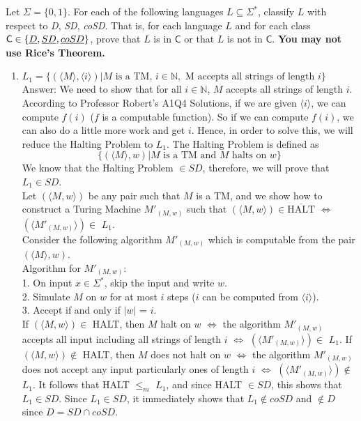 \documentclass{csc_assignment}
\begin{document}
\begin{description}
  Let $\Sigma = \{0,1\}$.
  For each of the following languages $L \subseteq \Sigma^*$, classify $L$ with respect to \emph{D}, \emph{SD}, \emph{coSD}.
  That is, for each language $L$ and for each class $\mathsf{C} \in \{\emph{D}, \emph{SD}, \emph{coSD}\}$, prove that $L$ is in $\mathsf{C}$ or that $L$ is not in $\mathsf{C}$.
  {\bf You may not use Rice's Theorem.}
  \begin{enumerate}
  \item $L_1 = \{(\langle{M}\rangle, \langle{i}\rangle) | M \text{ is a TM, } i \in \mathbb{N}, \text{ M accepts all strings of length }i\}$ \\
  Answer: We need to show that for all $i \in \mathbb{N}$, $M$ accepts all strings of length $i$. According to Professor Robert's A1Q4 Solutions, if we are given $\langle i \rangle$, we can compute $f(i)$ ($f$ is a computable function). So if we can compute $f(i)$, we can also do a little more work and get $i$. Hence, in order to solve this, we will reduce the Halting Problem to $L_{1}$. The Halting Problem is defined as $$\{(\langle M \rangle, w) | M \text{ is a TM and } M \text{ halts on } w\}$$ We know that the Halting Problem $\in SD$, therefore, we will prove that $L_{1} \in SD$. \\ Let $(\langle M, w \rangle)$ be any pair such that $M$ is a TM, and we show how to construct a Turing Machine $M'_{(M,w)}$ such that $(\langle M, w \rangle) \in \overline{\text{HALT}}$ $\Leftrightarrow$ $(\langle M'_{(M,w)}\rangle) \in$ $L_{1}$. \\ Consider the following algorithm $M'_{(M,w)}$ which is computable from the pair $(\langle M \rangle, w)$.\\ Algorithm for $M'_{(M,w)}$: \\ 1. On input $x \in \Sigma^{*}$, skip the input and write $w$. \\ 2. Simulate $M$ on $w$ for at most $i$ steps ($i$ can be computed from $\langle i \rangle$). \\ 3. Accept if and only if $|w|$ = $i$. \\ If $(\langle M, w \rangle) \in$ HALT, then $M$ halt on $w$ $\Leftrightarrow$ the algorithm $M'_{(M,w)}$ accepts all input including all strings of length $i$ $\Leftrightarrow$ $(\langle M'_{(M,w)}\rangle) \in$ $L_{1}$. If $(\langle M, w \rangle) \notin$ HALT, then $M$ does not halt on $w$ $\Leftrightarrow$ the algorithm $M'_{(M,w)}$ does not accept any input particularly ones of length $i$ $\Leftrightarrow$ $(\langle M'_{(M,w)}\rangle) \notin$ $L_{1}$. It follows that HALT $\leq_{m}$ $L_{1}$, and since HALT $\in SD$, this shows that $L_{1} \in SD$. Since $L_{1} \in SD$, it immediately shows that $L_{1} \notin coSD$ and $\notin D$ since $D = SD \cap coSD$.
  

\end{enumerate}
\end{description}
\end{document}
